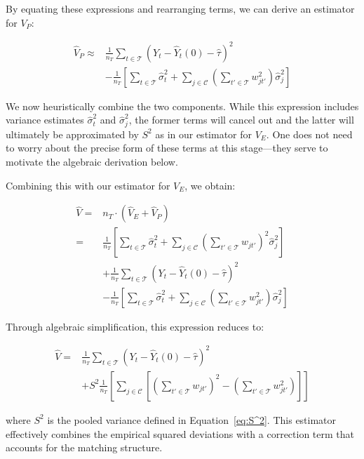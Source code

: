 \documentclass{mytemplate}
\begin{document}
By equating these expressions and rearranging terms, we can derive an estimator for $V_P$:

$$
\begin{aligned}
\hat{V}_P \approx & \frac{1}{n_T} \sum_{t \in \mathcal{T}}\left(Y_t-\hat{Y}_t(0)-\hat{\tau}\right)^2 \\
& -\frac{1}{n_T}\left[\sum_{t \in \mathcal{T}} \hat{\sigma}_t^2+\sum_{j \in \mathcal{C}}\left(\sum_{t' \in \mathcal{T}} w_{j t'}^2\right) \hat{\sigma}_j^2\right]
\end{aligned}
$$

We now heuristically combine the two components. While this expression includes variance estimates $\hat{\sigma}_t^2$ and $\hat{\sigma}_j^2$, the former terms will cancel out and the latter will ultimately be approximated by $S^2$ as in our estimator for $V_E$. One does not need to worry about the precise form of these terms at this stage—they serve to motivate the algebraic derivation below.


Combining this with our estimator for $V_E$, we obtain:

$$
\begin{aligned}
\hat{V}= & n_T \cdot (\hat{V}_E + \hat{V}_P) \\
= & \frac{1}{n_T}\left[\sum_{t \in \mathcal{T}} \hat{\sigma}_t^2+\sum_{j \in \mathcal{C}}\left(\sum_{t' \in \mathcal{T}} w_{j t'}\right)^2 \hat{\sigma}_j^2\right] \\
& +\frac{1}{n_T} \sum_{t \in \mathcal{T}}\left(Y_t-\hat{Y}_t(0)-\hat{\tau}\right)^2 \\
& -\frac{1}{n_T}\left[\sum_{t \in \mathcal{T}} \hat{\sigma}_t^2+\sum_{j \in \mathcal{C}}\left(\sum_{t' \in \mathcal{T}} w_{j t'}^2\right) \hat{\sigma}_j^2\right]
\end{aligned}
$$

Through algebraic simplification, this expression reduces to:

$$
\begin{aligned}
\hat{V} = & \frac{1}{n_T} \sum_{t \in \mathcal{T}}\left(Y_t-\hat{Y}_t(0)-\hat{\tau}\right)^2 \\
& +S^2 \frac{1}{n_T}\left[\sum_{j \in \mathcal{C}}\left[\left(\sum_{t' \in \mathcal{T}} w_{j t'}\right)^2-\left(\sum_{t' \in \mathcal{T}} w_{j t'}^2\right)\right]\right]
\end{aligned}
$$

where $S^2$ is the pooled variance defined in Equation~\ref{eq:S^2}. This estimator effectively combines the empirical squared deviations with a correction term that accounts for the matching structure.
\end{document}
